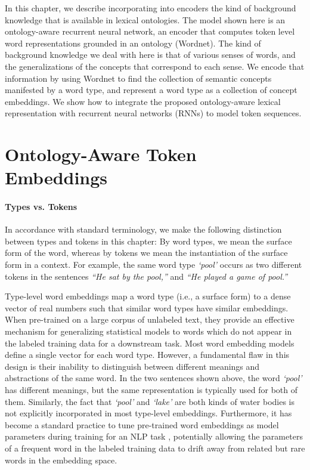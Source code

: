 In this chapter, we describe incorporating into encoders the kind of background
knowledge that is available in lexical ontologies. The model shown here is an
ontology-aware recurrent neural network, an encoder that computes token level 
word representations grounded in an ontology (Wordnet).
The kind of background knowledge we deal with here is that of various senses of
words, and the generalizations of the concepts that correspond to each sense.
We encode that information by using Wordnet to find the 
collection of semantic concepts manifested by a word type, and represent a word 
type as a collection of concept embeddings. We show
how to integrate the proposed ontology-aware lexical representation with 
recurrent neural networks (RNNs) to model token sequences.

\section{Ontology-Aware Token Embeddings}
\paragraph{Types vs. Tokens} In accordance with standard terminology, we make
the following distinction 
between types and tokens in this chapter: By word types, we mean the surface form 
of the word, whereas by tokens we mean the instantiation of the surface form in 
a context. For example, the same word type \textit{`pool'} occurs as two 
different tokens in the sentences \textit{``He sat by the pool,''} and 
\textit{``He played a game of pool.''}

Type-level word embeddings map a word type (i.e., a surface form) to a dense 
vector of real numbers such that similar word types have similar embeddings. 
When pre-trained on a large corpus of unlabeled text, they provide an effective 
mechanism for generalizing statistical models to words which do not appear in 
the labeled training data for a downstream task. Most word embedding models 
define a single vector for each word type. However, a 
fundamental flaw in this design is their inability to distinguish between 
different meanings and abstractions of the same word. In the two sentences shown 
above, the word \textit{`pool'} has different meanings, but the same 
representation is typically used for both of them. Similarly, the fact that 
\textit{`pool'} and \textit{`lake'} are both kinds of water bodies is not 
explicitly incorporated in most type-level embeddings.
Furthermore, it has become a standard practice to tune pre-trained word 
embeddings as model parameters during training for an NLP task 
\cite[e.g.,][]{chen:14,lample:16}, potentially allowing the parameters of a 
frequent word in the labeled training data to drift away from related but rare 
words in the embedding space. 


